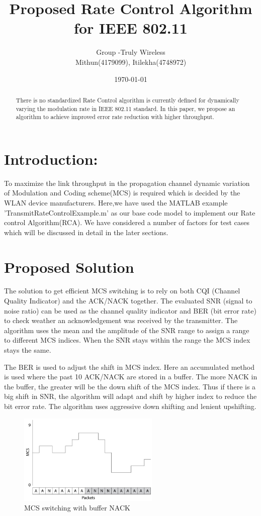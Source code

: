 \documentclass[a4paper]{article}
\title{\textbf{Proposed Rate Control Algorithm for IEEE 802.11}}
\author{Group -Truly Wireless\\Mithun(4179099), Itilekha(4748972)}
\date{\today}
\begin{document}
\maketitle

\begin{abstract}
There is no standardized Rate Control algorithm is currently defined for dynamically varying the modulation rate in IEEE 802.11 standard. In this paper, we propose an algorithm to achieve improved error rate reduction with higher throughput.
\end{abstract}

\section{Introduction:}
\label{sec:introduction}

To maximize the link throughput in the propagation channel dynamic variation of Modulation and Coding scheme(MCS) is required which is decided by the WLAN device manufacturers. Here,we have used the MATLAB example 'TransmitRateControlExample.m' as our base code model to implement our Rate control Algorithm(RCA). We have considered a number of factors for test cases which will be discussed in detail in the later sections.

\section{Proposed Solution}

The solution to get efficient MCS switching is to rely on both CQI (Channel Quality Indicator) and the ACK/NACK together. The evaluated SNR (signal to noise ratio) can be used as the channel quality indicator and BER (bit error rate) to check weather an acknowledgement was received by the transmitter. The algorithm uses the mean and the amplitude of the SNR range to assign a range to different MCS indices. When the SNR stays within the range the MCS index stays the same.

The BER is used to adjust the shift in MCS index. Here an accumulated method is used where the past 10 ACK/NACK are stored in a buffer. The more NACK in the buffer, the greater will be the down shift of the MCS index. Thus if there is a big shift in SNR, the algorithm will adapt and shift by higher index to reduce the bit error rate. The algorithm uses aggressive down shifting and lenient upshifting.

\begin{figure}[h]
\centering
\includegraphics[width=0.6\textwidth]{bufer.jpg}
\caption{\label{fig:buffer}MCS switching with buffer NACK}
\end{figure}
\end{document}
